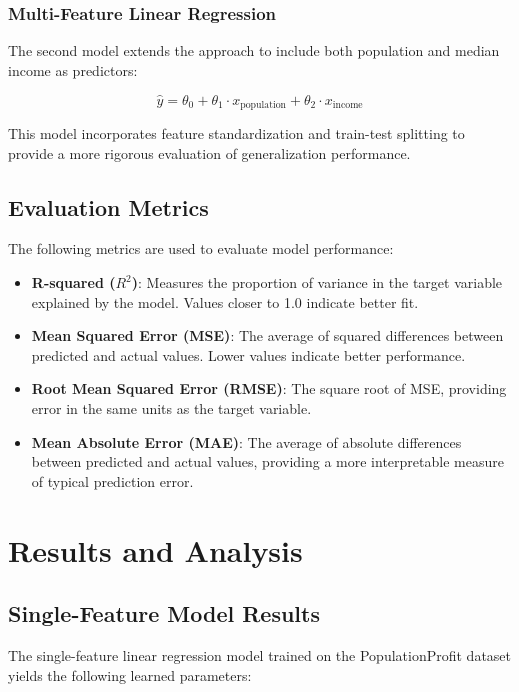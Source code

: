 \documentclass[conference]{IEEEtran}
\begin{document}
\subsubsection{Multi-Feature Linear Regression}

The second model extends the approach to include both population and median income as predictors:

\begin{equation}
\hat{y} = \theta_0 + \theta_1 \cdot x_{\text{population}} + \theta_2 \cdot x_{\text{income}}
\label{eq:multi}
\end{equation}

This model incorporates feature standardization and train-test splitting to provide a more rigorous evaluation of generalization performance.

\subsection{Evaluation Metrics}

The following metrics are used to evaluate model performance:

\begin{itemize}
\item \textbf{R-squared ($R^2$)}: Measures the proportion of variance in the target variable explained by the model. Values closer to 1.0 indicate better fit.
\item \textbf{Mean Squared Error (MSE)}: The average of squared differences between predicted and actual values. Lower values indicate better performance.
\item \textbf{Root Mean Squared Error (RMSE)}: The square root of MSE, providing error in the same units as the target variable.
\item \textbf{Mean Absolute Error (MAE)}: The average of absolute differences between predicted and actual values, providing a more interpretable measure of typical prediction error.
\end{itemize}

\section{Results and Analysis}

\subsection{Single-Feature Model Results}

The single-feature linear regression model trained on the PopulationProfit dataset yields the following learned parameters:
\end{document}
